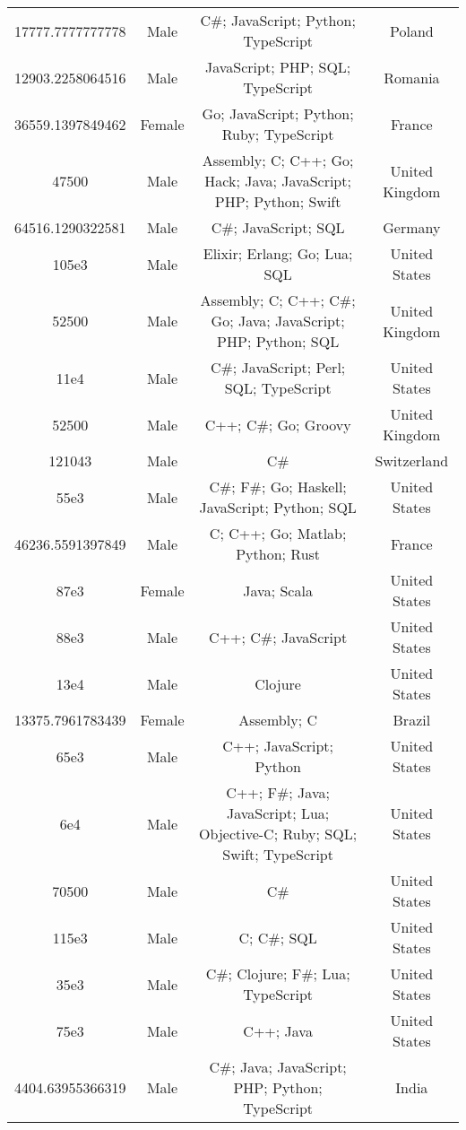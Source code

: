 \begin{center}
\begin{tabular}{ |c|c|c|c| }
17777.7777777778  &  Male  &  C\#; JavaScript; Python; TypeScript  &  Poland  \\ 
12903.2258064516  &  Male  &  JavaScript; PHP; SQL; TypeScript  &  Romania  \\ 
36559.1397849462  &  Female  &  Go; JavaScript; Python; Ruby; TypeScript  &  France  \\ 
47500  &  Male  &  Assembly; C; C++; Go; Hack; Java; JavaScript; PHP; Python; Swift  &  United Kingdom  \\ 
64516.1290322581  &  Male  &  C\#; JavaScript; SQL  &  Germany  \\ 
105e3  &  Male  &  Elixir; Erlang; Go; Lua; SQL  &  United States  \\ 
52500  &  Male  &  Assembly; C; C++; C\#; Go; Java; JavaScript; PHP; Python; SQL  &  United Kingdom  \\ 
11e4  &  Male  &  C\#; JavaScript; Perl; SQL; TypeScript  &  United States  \\ 
52500  &  Male  &  C++; C\#; Go; Groovy  &  United Kingdom  \\ 
121043  &  Male  &  C\#  &  Switzerland  \\ 
55e3  &  Male  &  C\#; F\#; Go; Haskell; JavaScript; Python; SQL  &  United States  \\ 
46236.5591397849  &  Male  &  C; C++; Go; Matlab; Python; Rust  &  France  \\ 
87e3  &  Female  &  Java; Scala  &  United States  \\ 
88e3  &  Male  &  C++; C\#; JavaScript  &  United States  \\ 
13e4  &  Male  &  Clojure  &  United States  \\ 
13375.7961783439  &  Female  &  Assembly; C  &  Brazil  \\ 
65e3  &  Male  &  C++; JavaScript; Python  &  United States  \\ 
6e4  &  Male  &  C++; F\#; Java; JavaScript; Lua; Objective-C; Ruby; SQL; Swift; TypeScript  &  United States  \\ 
70500  &  Male  &  C\#  &  United States  \\ 
115e3  &  Male  &  C; C\#; SQL  &  United States  \\ 
35e3  &  Male  &  C\#; Clojure; F\#; Lua; TypeScript  &  United States  \\ 
75e3  &  Male  &  C++; Java  &  United States  \\ 
4404.63955366319  &  Male  &  C\#; Java; JavaScript; PHP; Python; TypeScript  &  India  \\ 

\end{tabular}
\end{center}
